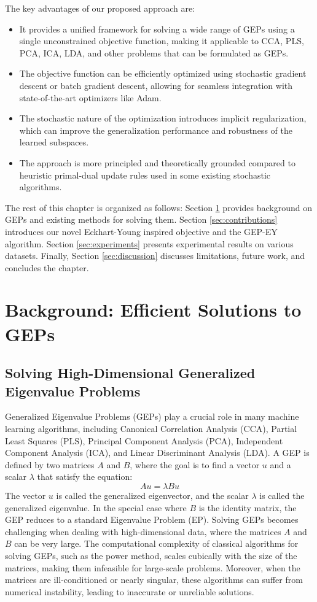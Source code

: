 The key advantages of our proposed approach are:
\begin{itemize}
    \item It provides a unified framework for solving a wide range of GEPs using a single unconstrained objective function, making it applicable to CCA, PLS, PCA, ICA, LDA, and other problems that can be formulated as GEPs.
    \item The objective function can be efficiently optimized using stochastic gradient descent or batch gradient descent, allowing for seamless integration with state-of-the-art optimizers like Adam.
    \item The stochastic nature of the optimization introduces implicit regularization, which can improve the generalization performance and robustness of the learned subspaces.
    \item The approach is more principled and theoretically grounded compared to heuristic primal-dual update rules used in some existing stochastic algorithms.
\end{itemize}

The rest of this chapter is organized as follows: Section \ref{sec:background-unified} provides background on GEPs and existing methods for solving them. Section \ref{sec:contributions} introduces our novel Eckhart-Young inspired objective and the GEP-EY algorithm. Section \ref{sec:experiments} presents experimental results on various datasets. Finally, Section \ref{sec:discussion} discusses limitations, future work, and concludes the chapter.

\section{Background: Efficient Solutions to GEPs}\label{sec:background-unified}
\subsection{Solving High-Dimensional Generalized Eigenvalue Problems}
Generalized Eigenvalue Problems (GEPs) play a crucial role in many machine learning algorithms, including Canonical Correlation Analysis (CCA), Partial Least Squares (PLS), Principal Component Analysis (PCA), Independent Component Analysis (ICA), and Linear Discriminant Analysis (LDA). A GEP is defined by two matrices $A$ and $B$, where the goal is to find a vector $u$ and a scalar $\lambda$ that satisfy the equation:
\begin{equation}
Au = \lambda Bu
\end{equation}
The vector $u$ is called the generalized eigenvector, and the scalar $\lambda$ is called the generalized eigenvalue. In the special case where $B$ is the identity matrix, the GEP reduces to a standard Eigenvalue Problem (EP).
Solving GEPs becomes challenging when dealing with high-dimensional data, where the matrices $A$ and $B$ can be very large. The computational complexity of classical algorithms for solving GEPs, such as the power method, scales cubically with the size of the matrices, making them infeasible for large-scale problems. Moreover, when the matrices are ill-conditioned or nearly singular, these algorithms can suffer from numerical instability, leading to inaccurate or unreliable solutions.

